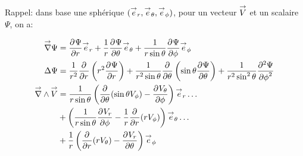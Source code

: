 Rappel: dans base une sphérique \((\vect e_r, \vect e_\theta, \vect e_\phi)\), pour
un vecteur \(\vect V\)
et un scalaire \(\Psi\), on a:

\begin{align*}
\vgrad \Psi &= \ddr{r}{\Psi} \vect e_r + \frac{1}{r}\ddr{\theta}{\Psi}\vect e_\theta + \frac{1}{r\sin\theta}\ddr{\phi}{\Psi} \vect e_\phi\\
 \Delta \Psi & = \frac{1}{r^2}\ddr{r}{}\left(r^2\ddr{r}{\Psi}\right)
+ \frac{1}{r^2\sin\theta}\ddr{\theta}{}\left(\sin\theta\ddr{\theta}{\Psi}\right)
+ \frac{1}{r^2\sin^2\theta}\ddr[2]{\phi}{\Psi} \\
\vrot \vect V &= \frac{1}{r\sin\theta}\left(\ddr{\theta}{}(\sin\theta V_\phi)-\ddr{\phi}{V_\theta}\right)\vect e_r \dots\\
&+ \left(\frac{1}{r\sin\theta}\ddr{\phi}{V_r} - \frac{1}{r}\ddr{r}{}(rV_\phi)\right) \vect e_\theta \dots \\
&+ \frac{1}{r}\left( \ddr{r}{}(rV_\theta) - \ddr{\theta}{V_r}\right)\vect e_\phi
\end{align*}


